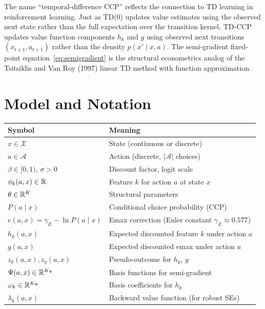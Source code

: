 \documentclass[11pt]{article}
\begin{document}
The name ``temporal-difference CCP'' reflects the connection to TD learning in reinforcement learning.
Just as TD($0$) updates value estimates using the observed next state rather than the full expectation over the transition kernel, TD-CCP updates value function components $h_k$ and $g$ using observed next transitions $(x_{t+1}, a_{t+1})$ rather than the density $p(x' \mid x,a)$.
The semi-gradient fixed-point equation~\eqref{eq:semigradient} is the structural econometrics analog of the Tsitsiklis and Van Roy (1997) linear TD method with function approximation.

\section{Model and Notation}

\begin{table}[h!]
\centering\small
\begin{tabular}{ll}
\toprule
Symbol & Meaning \\
\midrule
$x \in \mathcal{X}$ & State (continuous or discrete) \\
$a \in \mathcal{A}$ & Action (discrete, $|\mathcal{A}|$ choices) \\
$\beta \in [0,1)$, $\sigma > 0$ & Discount factor, logit scale \\
$\phi_k(a,x) \in \mathbb{R}$ & Feature $k$ for action $a$ at state $x$ \\
$\theta \in \mathbb{R}^K$ & Structural parameters \\
\midrule
$P(a \mid x)$ & Conditional choice probability (CCP) \\
$e(a,x) = \gamma_E - \ln P(a \mid x)$ & Emax correction (Euler constant $\gamma_E \approx 0.577$) \\
$h_k(a,x)$ & Expected discounted feature $k$ under action $a$ \\
$g(a,x)$ & Expected discounted emax under action $a$ \\
$z_k(a,x), z_g(a,x)$ & Pseudo-outcome for $h_k$, $g$ \\
\midrule
$\Psi(a,x) \in \mathbb{R}^{K_\Psi}$ & Basis functions for semi-gradient \\
$\omega_k \in \mathbb{R}^{K_\Psi}$ & Basis coefficients for $h_k$ \\
$\lambda_k(a,x)$ & Backward value function (for robust SEs) \\
\bottomrule
\end{tabular}
\end{table}
\FloatBarrier
\end{document}
